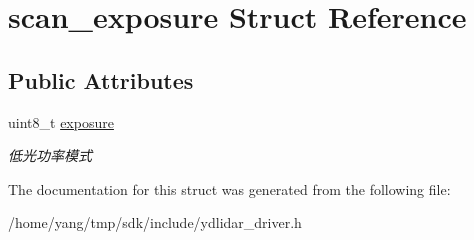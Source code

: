 \hypertarget{structscan__exposure}{}\section{scan\+\_\+exposure Struct Reference}
\label{structscan__exposure}
\subsection*{Public Attributes}
\begin{DoxyCompactItemize}
\item 
uint8\+\_\+t \hyperlink{structscan__exposure_a49591ef660667fcd1c3e1c2f3d764004}{exposure}\hypertarget{structscan__exposure_a49591ef660667fcd1c3e1c2f3d764004}{}\label{structscan__exposure_a49591ef660667fcd1c3e1c2f3d764004}

\begin{DoxyCompactList}\small\item\em 低光功率模式 \end{DoxyCompactList}\end{DoxyCompactItemize}


The documentation for this struct was generated from the following file\+:\begin{DoxyCompactItemize}
\item 
/home/yang/tmp/sdk/include/ydlidar\+\_\+driver.\+h\end{DoxyCompactItemize}
